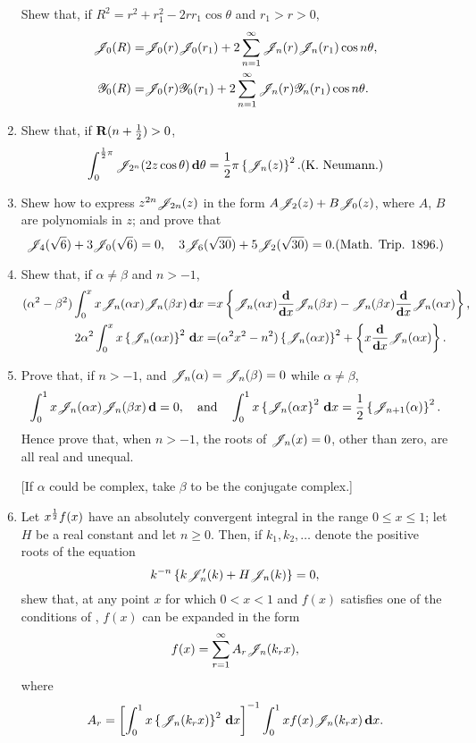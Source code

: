 \begin{enumerate}
  Shew that, if
  $R^{2} = r^{2} + r_{1}^{2} - 2rr_{1}\cos\theta$
  and
  $r_{1} > r > 0$,
  \begin{align*}
    \mathscr{J}_{0}(R)
    =&
    \mathscr{J}_{0}(r) \mathscr{J}_{0}(r_{1})
    +
    2 \sum_{n=1}^{\infty} \mathscr{J}_{n}(r) \mathscr{J}_{n}(r_{1}) \cos n\theta,
    \\
    \mathscr{Y}_{0}(R)
    =&
    \mathscr{J}_{0}(r) \mathscr{Y}_{0}(r_{1})
    +
    2 \sum_{n=1}^{\infty} \mathscr{J}_{n}(r) \mathscr{Y}_{n}(r_{1}) \cos n\theta.
  \end{align*}
\item
  Shew that, if $\operatorname{\mathbf{R}}(n+\frac{1}{2}) > 0$,
  $$
  \int_{0}^{\half\pi}
  \besJ_{2^{n}}(2z\cos\theta) \dmeasure \theta
  =
  \half\pi \thebrace{ \besJ_{n}(z) }^{2}.
  \addexamplecitation{K. Neumann.}
  $$
%
%
\item
  Shew how to express $z^{2n} \mathscr{J}_{2n}(z)$ in the form
  $A \mathscr{J}_{2}(z) + B \mathscr{J}_{0}(z)$, where $A$, $B$ are polynomials in
  $z$; and prove that
  $$
  \besJ_{4}(\sqrt{6}) + 3 \besJ_{0}(\sqrt{6}) = 0,
  \quad
  3 \besJ_{6}(\sqrt{30}) + 5 \besJ_{2}(\sqrt{30}) = 0.
  \addexamplecitation{Math. Trip. 1896.}
  $$
\item
  Shew that, if $\alpha \neq \beta$ and $n > -1$,
  \begin{align*}
    (\alpha^{2}-\beta^{2})
    \int_{0}^{x} x \mathscr{J}_{n}(\alpha x) \mathscr{J}_{n}(\beta x) \, \mathbf{d} x
    =&
    x \left\{ 
      \mathscr{J}_{n}(\alpha x) \frac{\mathbf{d}}{\mathbf{d} x} \mathscr{J}_{n}(\beta x)
      - \mathscr{J}_{n}(\beta x) \frac{\mathbf{d}}{\mathbf{d} x} \mathscr{J}_{n}(\alpha x)
     \right\},
    \\
    2 \alpha^{2}
    \int_{0}^{x}
    x \left\{  \mathscr{J}_{n}(\alpha x)  \right\}^{2} \, \mathbf{d} x
    =&
    (\alpha^{2} x^{2} - n^{2})
    \left\{  \mathscr{J}_{n}(\alpha x)  \right\}^{2}
    +
    \left\{ 
      x \frac{\mathbf{d}}{\mathbf{d} x} \mathscr{J}_{n}(\alpha x)
     \right\}.
  \end{align*}
\item
  Prove that, if $n > -1$, and $\mathscr{J}_{n}(\alpha) = \mathscr{J}_{n}(\beta) =
  0$ while $\alpha \neq \beta$,
  $$
  \int_{0}^{1} x \mathscr{J}_{n}(\alpha x) \mathscr{J}_{n}(\beta x) \, \mathbf{d} = 0,
  \quad
  \textrm{and}
  \quad
  \int_{0}^{1} x \left\{ \mathscr{J}_{n}(\alpha x \right\}^{2} \, \mathbf{d} x
  =
  \frac{1}{2} \left\{  \mathscr{J}_{n+1}(\alpha) \right\}^{2}.
  $$
  Hence prove that, when $n > -1$, the roots of $\mathscr{J}_{n}(x)=0$, other
  than zero, are all real and unequal.

  [If $\alpha$ could be complex, take $\beta$ to be the conjugate
  complex.]
\item
  Let $x^{\frac{1}{2}} f(x)$ have an absolutely convergent integral in the
  range $0 \leq x \leq 1$; let $H$ be a real constant and let $n \geq
  0$. Then, if $k_{1}, k_{2}, \ldots$ denote the positive roots of
  the equation
  $$
  k^{-n}
  \left\{  k \mathscr{J}'_{n}(k) + H \mathscr{J}_{n}(k) \right\}
  =
  0,
  $$
  shew that, at any point $x$ for which $0 < x < 1$ and $f(x)$
  satisfies one of the conditions of ,
  $f(x)$ can be expanded in the form
  $$
  f(x) = \sum_{r=1}^{\infty} A_{r} \mathscr{J}_{n}(k_{r} x),
  $$
  where
  $$
  A_{r}
  =
  \left[  \int_{0}^{1} x \left\{ \mathscr{J}_{n}(k_{r}x) \right\}^{2} \, \mathbf{d} x \right]^{-1}
  \int_{0}^{1} x f(x) \mathscr{J}_{n}(k_{r}x) \, \mathbf{d} x.
  $$


\end{enumerate}
